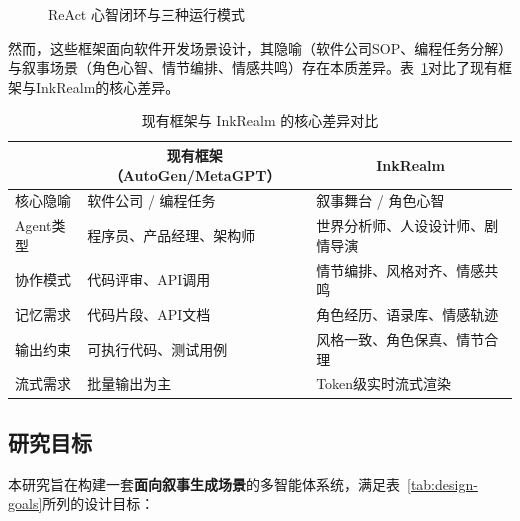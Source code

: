\documentclass[UTF8,oneside,a4paper]{ctexart}
\begin{document}
\begin{figure}[H]
\centering
{}
\caption{ReAct 心智闭环与三种运行模式}
\label{fig:react-loop}
\end{figure}

然而，这些框架面向软件开发场景设计，其隐喻（软件公司SOP、编程任务分解）与叙事场景（角色心智、情节编排、情感共鸣）存在本质差异。表~\ref{tab:comparison}对比了现有框架与InkRealm的核心差异。

\begin{table}[H]
\centering
\caption{现有框架与 InkRealm 的核心差异对比}
\label{tab:comparison}
\renewcommand{\arraystretch}{1.4}
\begin{tabular}{p{3cm}p{4.5cm}p{5cm}}
\toprule
\rowcolor{tableheader}
\multicolumn{1}{c}{\color{white}\textbf{维度}} & \multicolumn{1}{c}{\color{white}\textbf{现有框架（AutoGen/MetaGPT）}} & \multicolumn{1}{c}{\color{white}\textbf{InkRealm}} \\
\midrule
核心隐喻 & 软件公司 / 编程任务 & 叙事舞台 / 角色心智 \\
Agent类型 & 程序员、产品经理、架构师 & 世界分析师、人设设计师、剧情导演 \\
协作模式 & 代码评审、API调用 & 情节编排、风格对齐、情感共鸣 \\
记忆需求 & 代码片段、API文档 & 角色经历、语录库、情感轨迹 \\
输出约束 & 可执行代码、测试用例 & 风格一致、角色保真、情节合理 \\
流式需求 & 批量输出为主 & Token级实时流式渲染 \\
\bottomrule
\end{tabular}
\end{table}

\subsection{研究目标}
\label{sec:objectives}

本研究旨在构建一套\textbf{面向叙事生成场景}的多智能体系统，满足表~\ref{tab:design-goals}所列的设计目标：
\end{document}
